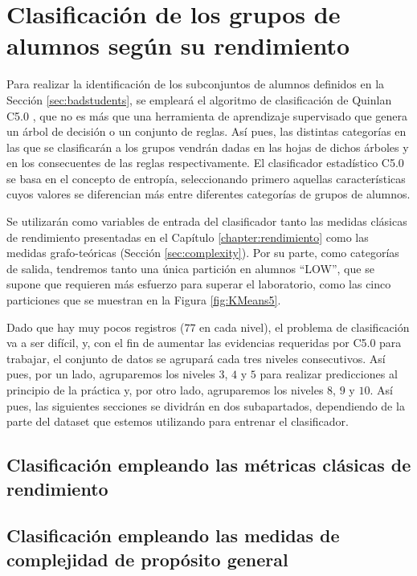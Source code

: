 \chapter{Clasificación de los grupos de alumnos según su rendimiento}\label{sec:chapterXIII}

Para realizar la identificación de los subconjuntos de alumnos definidos en la Sección \ref{sec:badstudents}, se empleará el algoritmo de clasificación de Quinlan C5.0 \cite{Quinlan:See5C5}, que no es más que una herramienta de aprendizaje supervisado que genera un árbol de decisión o un conjunto de reglas. Así pues, las distintas categorías en las que se clasificarán a los grupos vendrán dadas en las hojas de dichos árboles y en los consecuentes de las reglas respectivamente. El clasificador estadístico C5.0 se basa en el concepto de entropía, seleccionando primero aquellas características cuyos valores se diferencian más entre diferentes categorías de grupos de alumnos.

Se utilizarán como variables de entrada del clasificador tanto las medidas clásicas de rendimiento presentadas en el Capítulo \ref{chapter:rendimiento} como las medidas grafo-teóricas (Sección \ref{sec:complexity}). Por su parte, como categorías de salida, tendremos tanto una única partición en alumnos ``LOW'', que se supone que requieren más esfuerzo para superar el laboratorio, como las cinco particiones que se muestran en la Figura \ref{fig:KMeans5}.

Dado que hay muy pocos registros ($77$ en cada nivel), el problema de clasificación va a ser difícil, y, con el fin de aumentar las evidencias requeridas por C5.0 para trabajar, el conjunto de datos se agrupará cada tres niveles consecutivos. Así pues, por un lado, agruparemos los niveles $3$, $4$ y $5$ para realizar predicciones al principio de la práctica y, por otro lado, agruparemos los niveles $8$, $9$ y $10$. Así pues, las siguientes secciones se dividrán en dos subapartados, dependiendo de la parte del dataset que estemos utilizando para entrenar el clasificador.

\section{Clasificación empleando las métricas clásicas de rendimiento}



\section{Clasificación empleando las medidas de complejidad de propósito general}

